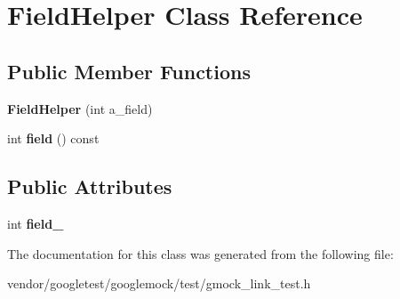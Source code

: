 \hypertarget{classFieldHelper}{}\section{Field\+Helper Class Reference}
\label{classFieldHelper}
\subsection*{Public Member Functions}
\begin{DoxyCompactItemize}
\item 
{\bfseries Field\+Helper} (int a\+\_\+field)\hypertarget{classFieldHelper_a06729cbd5da2993e8007cb62f1d00b3a}{}\label{classFieldHelper_a06729cbd5da2993e8007cb62f1d00b3a}

\item 
int {\bfseries field} () const \hypertarget{classFieldHelper_a69f50394c04733e6dc854f5186b10fd5}{}\label{classFieldHelper_a69f50394c04733e6dc854f5186b10fd5}

\end{DoxyCompactItemize}
\subsection*{Public Attributes}
\begin{DoxyCompactItemize}
\item 
int {\bfseries field\+\_\+}\hypertarget{classFieldHelper_a50a7ec9efc60377363d5ce8bea1708ac}{}\label{classFieldHelper_a50a7ec9efc60377363d5ce8bea1708ac}

\end{DoxyCompactItemize}


The documentation for this class was generated from the following file\+:\begin{DoxyCompactItemize}
\item 
vendor/googletest/googlemock/test/gmock\+\_\+link\+\_\+test.\+h\end{DoxyCompactItemize}
